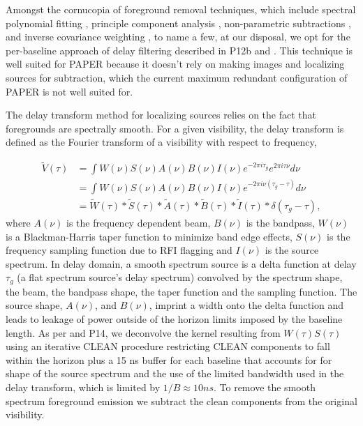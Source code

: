 \documentclass[twocolumn,numberedappendix]{emulateapj} \shorttitle{PSA64}
\begin{document}
Amongst the cornucopia of foreground removal techniques, which include spectral
polynomial fitting \citep{wang_et_al2006,liu_et_al2009,bowman_et_al2009},
principle component analysis
\citep{paciga_et_al2013,paciga_et_al2011,liu_tegmark2011,masui_et_al2013},
non-parametric subtractions
\citep{harker_et_al2009,chapman_et_al2013}, and inverse
covariance weighting
\citep{dillon_et_al2013b,liu_tegmark2011,dillon_et_al2013a}, to name a few,
at our
disposal, we opt for the per-baseline approach of delay filtering described in
P12b and \citet{petrovic_oh2011}. This technique is well suited for PAPER because it
doesn't rely on making images and localizing sources for subtraction, which 
the current maximum redundant configuration of PAPER is not well suited for.

The delay transform method for localizing sources relies on the fact that
foregrounds are spectrally smooth. For a given visibility, the delay transform
is defined as the Fourier transform of a visibility with respect to frequency, 

\begin{align}\label{eqn:delay_transform}
\tilde{V}(\tau) &= \int{W(\nu)S(\nu)A(\nu)B(\nu)I(\nu)
                   e^{-2\pi{i}\tau_{g}}e^{2\pi{i}\tau\nu}d\nu} \\
                &= \int{W(\nu)S(\nu)A(\nu)B(\nu)I(\nu)
                   e^{-2\pi{i}\nu(\tau_{g}-\tau)}d\nu} \\
                &= \tilde{W}(\tau) \ast\tilde{S}(\tau) \ast \tilde{A}(\tau) \ast
                   \tilde{B}(\tau) \ast \tilde{I}(\tau) \ast
                   \delta(\tau_{g} - \tau),
\end{align}
where $A(\nu)$ is the frequency dependent beam, $B(\nu)$ is the bandpass,
$W(\nu)$ is a Blackman-Harris taper function to minimize band edge effects,
$S(\nu)$ is the frequency sampling function due to RFI flagging  and $I(\nu)$ is
the source spectrum. In delay domain, a smooth spectrum source is a delta
function at delay $\tau_{g}$ (a flat spectrum source's delay spectrum)
convolved by the spectrum shape, the beam, the bandpass shape, the taper
function and the sampling function. The source shape, $A(\nu)$, and $B(\nu)$,
imprint a width onto the delta function and leads to leakage of power outside
of the horizon limits imposed by the baseline length.  As per
\cite{parsons_backer2009} and P14, we deconvolve the kernel
resulting from $W(\tau)S(\tau)$ using an iterative CLEAN procedure
\citep{hogbom1974} restricting CLEAN components to fall within the horizon plus
a 15 ns buffer for each baseline that accounts for for shape of the source
spectrum and the use of the limited bandwidth used in the delay transform,
which is limited by $1/B \approx 10 ns$. To remove the smooth spectrum
foreground emission we subtract the clean components from the original
visibility.
\end{document}
